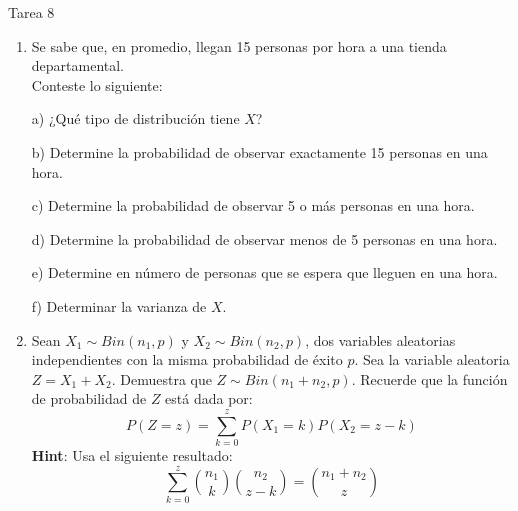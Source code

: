 \documentclass[a4paper, 12pt]{article}
\newcommand{\Aspace}{0.2cm}
\begin{document}
\newpage
\begin{center}
    { \LARGE Tarea 8}
\end{center}

\begin{enumerate}
    \item Se sabe que, en promedio, llegan 15 personas por hora a una tienda departamental.
    \\ Conteste lo siguiente:
    \vspace{\Aspace} \par
    a) ¿Qué tipo de distribución tiene $X$?
    \\ { \color{azul}  }

    \vspace{\Aspace} \par
    b) Determine la probabilidad de observar exactamente 15 personas en una hora.
    \\ { \color{azul}  }

    \vspace{\Aspace} \par
    c) Determine la probabilidad de observar 5 o más personas en una hora.
    \\ { \color{azul}  }

    \vspace{\Aspace} \par
    d) Determine la probabilidad de observar menos de 5 personas en una hora.
    \\ { \color{azul}  }

    \vspace{\Aspace} \par
    e) Determine en número de personas que se espera que lleguen en una hora.
    \\ { \color{azul}  }

    \vspace{\Aspace} \par
    f) Determinar la varianza de $X$.
    \\ { \color{azul}  }



    \item Sean $X_{1} \sim Bin(n_{1}, p)$ y $X_{2} \sim Bin(n_{2}, p)$, dos variables aleatorias independientes con la misma probabilidad de éxito $p$.  
    Sea la variable aleatoria $Z = X_{1} + X_{2}$. Demuestra que $Z \sim Bin(n_{1} + n_{2}, p)$.  
    Recuerde que la función de probabilidad de $Z$ está dada por:
    \[
        P(Z = z) = \sum_{k = 0}^{z} P(X_{1} = k) P(X_{2} = z - k)
    \]
    \textbf{Hint}: Usa el siguiente resultado:
    \[
        \sum_{k = 0}^{z} \binom{n_{1}}{k} \binom{n_{2}}{z - k} = \binom{n_{1} + n_{2}}{z}
    \]
    \vspace{\Aspace} \par
    { \color{azul}  }



\end{enumerate}
\end{document}
